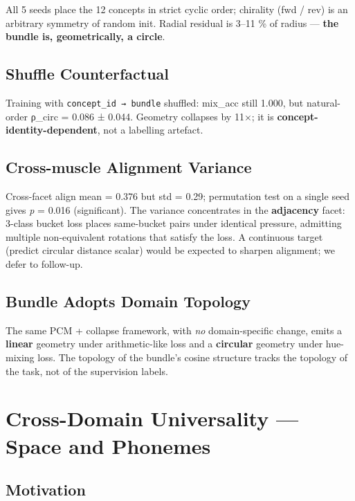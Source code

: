 All 5 seeds place the 12 concepts in strict cyclic order; chirality
(fwd / rev) is an arbitrary symmetry of random init. Radial residual is
3--11 \% of radius --- \textbf{the bundle is, geometrically, a circle}.

\subsection{Shuffle Counterfactual}

Training with \texttt{concept\_id\ →\ bundle} shuffled: mix\_acc still 1.000, but
natural-order \textbar ρ\_circ\textbar{} = 0.086 ± 0.044. Geometry collapses by 11×; it is
\textbf{concept-identity-dependent}, not a labelling artefact.

\subsection{Cross-muscle Alignment Variance}

Cross-facet align mean = 0.376 but std = 0.29; permutation test on a
single seed gives \emph{p} = 0.016 (significant). The variance concentrates
in the \textbf{adjacency} facet: 3-class bucket loss places same-bucket pairs
under identical pressure, admitting multiple non-equivalent rotations
that satisfy the loss. A continuous target (predict circular distance
scalar) would be expected to sharpen alignment; we defer to follow-up.

\subsection{Bundle Adopts Domain Topology}

The same PCM + collapse framework, with \emph{no} domain-specific change,
emits a \textbf{linear} geometry under arithmetic-like loss and a
\textbf{circular} geometry under hue-mixing loss. The topology of the
bundle's cosine structure tracks the topology of the task, not of the
supervision labels.

\medskip

\section{Cross-Domain Universality --- Space and Phonemes}

\subsection{Motivation}

